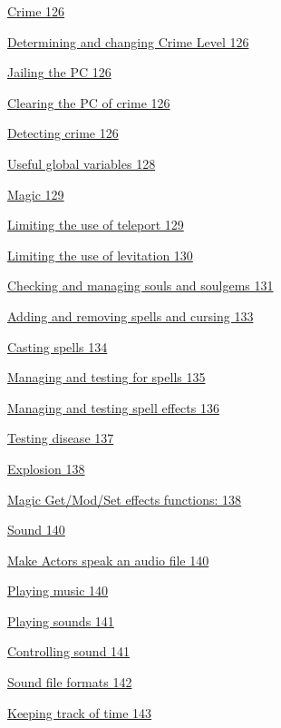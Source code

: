 \documentclass[
]{article}
\begin{document}
\protect\hyperlink{crime}{Crime 126}

\protect\hyperlink{determining-and-changing-crime-level}{Determining and
changing Crime Level 126}

\protect\hyperlink{jailing-the-pc}{Jailing the PC 126}

\protect\hyperlink{clearing-the-pc-of-crime}{Clearing the PC of crime
126}

\protect\hyperlink{detecting-crime}{Detecting crime 126}

\protect\hyperlink{useful-global-variables}{Useful global variables 128}

\protect\hyperlink{magic}{Magic 129}

\protect\hyperlink{limiting-the-use-of-teleport}{Limiting the use of
teleport 129}

\protect\hyperlink{limiting-the-use-of-levitation}{Limiting the use of
levitation 130}

\protect\hyperlink{checking-and-managing-souls-and-soulgems}{Checking
and managing souls and soulgems 131}

\protect\hyperlink{adding-and-removing-spells-and-cursing}{Adding and
removing spells and cursing 133}

\protect\hyperlink{casting-spells}{Casting spells 134}

\protect\hyperlink{managing-and-testing-for-spells}{Managing and testing
for spells 135}

\protect\hyperlink{managing-and-testing-spell-effects}{Managing and
testing spell effects 136}

\protect\hyperlink{testing-disease}{Testing disease 137}

\protect\hyperlink{explosion}{Explosion 138}

\protect\hyperlink{magic-getmodset-effects-functions}{Magic Get/Mod/Set
effects functions: 138}

\protect\hyperlink{sound}{Sound 140}

\protect\hyperlink{make-actors-speak-an-audio-file}{Make Actors speak an
audio file 140}

\protect\hyperlink{playing-music}{Playing music 140}

\protect\hyperlink{playing-sounds}{Playing sounds 141}

\protect\hyperlink{controlling-sound}{Controlling sound 141}

\protect\hyperlink{sound-file-formats}{Sound file formats 142}

\protect\hyperlink{keeping-track-of-time}{Keeping track of time 143}
\end{document}
